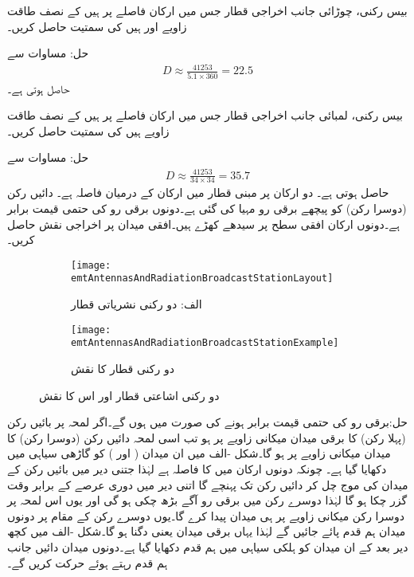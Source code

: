 بیس رکنی، چوڑائی جانب اخراجی قطار جس میں ارکان  فاصلے پر ہیں کے نصف طاقت زاویے  اور  ہیں کی سمتیت حاصل کریں۔

حل: مساوات  سے 
\begin{align*}
D \approx \frac{\num{41253}}{5.1 \times 360}=22.5
\end{align*}
حاصل ہوتی ہے۔


بیس رکنی، لمبائی جانب اخراجی قطار جس میں ارکان  فاصلے پر ہیں کے نصف طاقت زاویے  ہیں کی سمتیت حاصل کریں۔

حل: مساوات  سے 
\begin{align*}
D \approx \frac{\num{41253}}{34 \times 34}=35.7
\end{align*}
حاصل ہوتی ہے۔
دو ارکان پر مبنی قطار میں ارکان کے درمیان فاصلہ  ہے۔ دائیں رکن (دوسرا رکن) کو  پیچھے برقی رو مہیا کی گئی ہے۔دونوں برقی رو کی حتمی قیمت برابر ہے۔دونوں ارکان افقی سطح پر سیدھے کھڑے ہیں۔افقی میدان پر اخراجی نقش حاصل کریں۔
   
\begin{figure}
\centering
\begin{subfigure}{0.5\textwidth}
\centering
\texttt{[image: emtAntennasAndRadiationBroadcastStationLayout]}
\caption*{الف: دو رکنی نشریاتی قطار}
\end{subfigure}%
%
\begin{subfigure}{0.5\textwidth}
\centering
\texttt{[image: emtAntennasAndRadiationBroadcastStationExample]}
\caption*{دو رکنی قطار کا نقش}
\end{subfigure}%
\caption{دو رکنی اشاعتی قطار اور اس کا نقش}
\label{شکل_اینٹینا_اشاعتی_قطار}
\end{figure}

حل:برقی رو کی حتمی قیمت برابر ہونے کی صورت میں  ہوں گے۔اگر لمحہ  پر بائیں رکن (پہلا رکن) کا برقی میدان  میکانی زاویے پر ہو تب اسی لمحہ دائیں رکن (دوسرا رکن) کا میدان  میکانی زاویے پر ہو گا۔شکل -الف میں ان میدان ( اور ) کو گاڑھی سیاہی میں دکھایا گیا ہے۔ چونکہ دونوں ارکان میں  کا فاصلہ ہے لہٰذا جتنی دیر میں بائیں رکن کے میدان کی موج  چل کر دائیں رکن تک پہنچے گا اتنی دیر میں دوری عرصے کے  برابر وقت گزر چکا ہو گا لہٰذا دوسرے رکن میں برقی رو  آگے بڑھ چکی ہو گی اور یوں اس لمحہ پر دوسرا رکن  میکانی زاویے پر ہی میدان پیدا کرے گا۔یوں دوسرے رکن کے مقام پر دونوں میدان ہم قدم پائے جائیں گے لہٰذا یہاں برقی میدان  یعنی دگنا ہو گا۔شکل -الف میں کچھ دیر بعد کے ان میدان کو ہلکی سیاہی میں ہم قدم دکھایا گیا ہے۔دونوں میدان دائیں جانب ہم قدم رہتے ہوئے حرکت کریں گے۔

